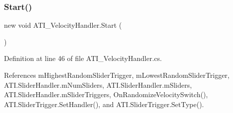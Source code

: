 \subsubsection{\texorpdfstring{Start()}{Start()}}
{\footnotesize\ttfamily new void A\+T\+I\+\_\+\+Velocity\+Handler.\+Start (\begin{DoxyParamCaption}{ }\end{DoxyParamCaption})\hspace{0.3cm}{\ttfamily [private]}}



Definition at line 46 of file A\+T\+I\+\_\+\+Velocity\+Handler.\+cs.



References m\+Highest\+Random\+Slider\+Trigger, m\+Lowest\+Random\+Slider\+Trigger, A\+T\+I.\+Slider\+Handler.\+m\+Num\+Sliders, A\+T\+I.\+Slider\+Handler.\+m\+Sliders, A\+T\+I.\+Slider\+Handler.\+m\+Slider\+Triggers, On\+Randomize\+Velocity\+Switch(), A\+T\+I.\+Slider\+Trigger.\+Set\+Handler(), and A\+T\+I.\+Slider\+Trigger.\+Set\+Type().


